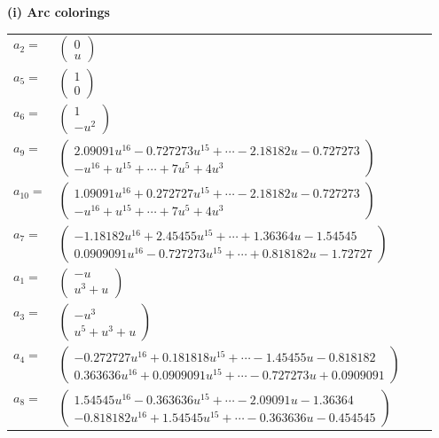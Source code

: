 \documentclass[1p]{elsarticle_modified}
\theoremstyle{definition}
\begin{document}
\flushleft \textbf{(i) Arc colorings}\\
\begin{tabular}{m{7pt} m{180pt} m{7pt} m{180pt} }
\flushright $a_{2}=$&$\begin{pmatrix}0\\u\end{pmatrix}$ \\
\flushright $a_{5}=$&$\begin{pmatrix}1\\0\end{pmatrix}$ \\
\flushright $a_{6}=$&$\begin{pmatrix}1\\- u^2\end{pmatrix}$ \\
\flushright $a_{9}=$&$\begin{pmatrix}2.09091 u^{16}-0.727273 u^{15}+\cdots-2.18182 u-0.727273\\- u^{16}+u^{15}+\cdots+7 u^5+4 u^3\end{pmatrix}$ \\
\flushright $a_{10}=$&$\begin{pmatrix}1.09091 u^{16}+0.272727 u^{15}+\cdots-2.18182 u-0.727273\\- u^{16}+u^{15}+\cdots+7 u^5+4 u^3\end{pmatrix}$ \\
\flushright $a_{7}=$&$\begin{pmatrix}-1.18182 u^{16}+2.45455 u^{15}+\cdots+1.36364 u-1.54545\\0.0909091 u^{16}-0.727273 u^{15}+\cdots+0.818182 u-1.72727\end{pmatrix}$ \\
\flushright $a_{1}=$&$\begin{pmatrix}- u\\u^3+u\end{pmatrix}$ \\
\flushright $a_{3}=$&$\begin{pmatrix}- u^3\\u^5+u^3+u\end{pmatrix}$ \\
\flushright $a_{4}=$&$\begin{pmatrix}-0.272727 u^{16}+0.181818 u^{15}+\cdots-1.45455 u-0.818182\\0.363636 u^{16}+0.0909091 u^{15}+\cdots-0.727273 u+0.0909091\end{pmatrix}$ \\
\flushright $a_{8}=$&$\begin{pmatrix}1.54545 u^{16}-0.363636 u^{15}+\cdots-2.09091 u-1.36364\\-0.818182 u^{16}+1.54545 u^{15}+\cdots-0.363636 u-0.454545\end{pmatrix}$ \\

\end{tabular}
\end{document}

